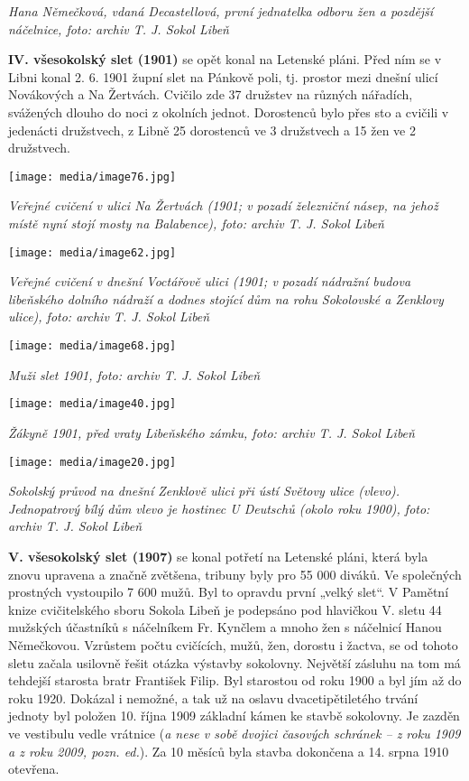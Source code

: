 \emph{Hana Němečková, vdaná Decastellová, první jednatelka odboru žen a
pozdější náčelnice, foto: archiv T. J. Sokol Libeň}

\textbf{IV. všesokolský slet (1901)} se opět konal na Letenské pláni.
Před ním se v Libni konal 2. 6. 1901 župní slet na Pánkově poli, tj.
prostor mezi dnešní ulicí Novákových a Na Žertvách. Cvičilo zde 37
družstev na různých nářadích, svážených dlouho do noci z okolních
jednot. Dorostenců bylo přes sto a cvičili v jedenácti družstvech, z
Libně 25 dorostenců ve 3 družstvech a 15 žen ve 2 družstvech.

\texttt{[image: media/image76.jpg]}

\emph{Veřejné cvičení v ulici Na Žertvách (1901; v pozadí železniční
násep, na jehož místě nyní stojí mosty na Balabence), foto: archiv T. J.
Sokol Libeň}

\texttt{[image: media/image62.jpg]}

\emph{Veřejné cvičení v dnešní Voctářově ulici (1901; v pozadí nádražní
budova libeňského dolního nádraží a dodnes stojící dům na rohu
Sokolovské a Zenklovy ulice), foto: archiv T. J. Sokol Libeň}

\texttt{[image: media/image68.jpg]}

\emph{Muži slet 1901, foto: archiv T. J. Sokol Libeň}

\texttt{[image: media/image40.jpg]}

\emph{Žákyně 1901, před vraty Libeňského zámku, foto: archiv T. J. Sokol
Libeň}

\texttt{[image: media/image20.jpg]}

\emph{Sokolský průvod na dnešní Zenklově ulici při ústí Světovy ulice
(vlevo). Jednopatrový bílý dům vlevo je hostinec U Deutschů (okolo roku
1900), foto: archiv T. J. Sokol Libeň}

\textbf{V. všesokolský slet (1907)} se konal potřetí na Letenské pláni,
která byla znovu upravena a značně zvětšena, tribuny byly pro 55 000
diváků. Ve společných prostných vystoupilo 7 600 mužů. Byl to opravdu
první „velký slet``. V Pamětní knize cvičitelského sboru Sokola Libeň je
podepsáno pod hlavičkou V. sletu 44 mužských účastníků s náčelníkem Fr.
Kynčlem a mnoho žen s náčelnicí Hanou Němečkovou. Vzrůstem počtu
cvičících, mužů, žen, dorostu i žactva, se od tohoto sletu začala
usilovně řešit otázka výstavby sokolovny. Největší zásluhu na tom má
tehdejší starosta bratr František Filip. Byl starostou od roku 1900 a
byl jím až do roku 1920. Dokázal i nemožné, a tak už na oslavu
dvacetipětiletého trvání jednoty byl položen 10. října 1909 základní
kámen ke stavbě sokolovny. Je zazděn ve vestibulu vedle vrátnice
(\emph{a nese v sobě dvojici časových schránek -- z roku 1909 a z roku
2009, pozn. ed.}). Za 10 měsíců byla stavba dokončena a 14. srpna 1910
otevřena.

